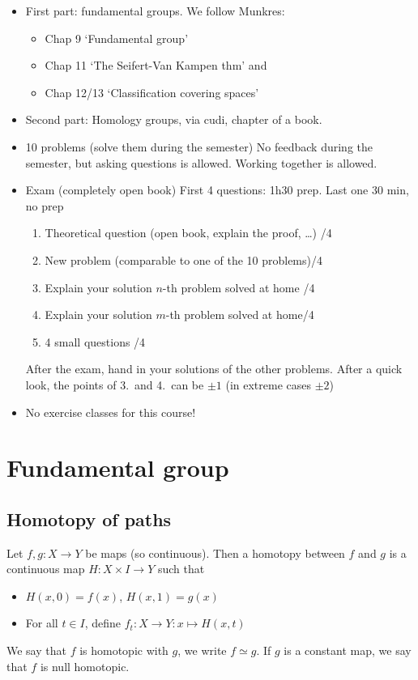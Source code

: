 

\begin{itemize}
    \item First part: fundamental groups. We follow Munkres:
        \begin{itemize}
            \item Chap 9 `Fundamental group'
            \item Chap 11 `The Seifert-Van Kampen thm' and
            \item Chap 12/13 `Classification covering spaces'
        \end{itemize}
    \item Second part: Homology groups, via cudi, chapter of a book.
    \item 10 problems (solve them during the semester) No feedback during the semester, but asking questions is allowed. Working together is allowed.
    \item Exam (completely open book) First 4 questions: 1h30 prep. Last one 30 min, no prep
        \begin{enumerate}
            \item Theoretical question (open book, explain the proof, \ldots) \hfill /4
            \item New problem (comparable to one of the 10 problems)\hfill /4
            \item Explain your solution $n$-th problem solved at home \hfill /4
            \item Explain your solution $m$-th problem solved at home\hfill /4
            \item 4 small questions \hfill /4
        \end{enumerate}
        After the exam, hand in your solutions of the other problems. After a quick look, the points of 3.\ and 4.\ can be $\pm 1$ (in extreme cases $\pm 2$)
    \item No exercise classes for this course!
\end{itemize}

\setcounter{chapter}{-1}
\setcounter{chapter}{8}
\chapter{Fundamental group}

\setcounter{section}{50}
\section{Homotopy of paths}
\begin{definition}[Homotopy]
    Let $f,g:X\to Y$ be maps (so continuous). Then a homotopy between $f$ and $g$ is a continuous map $H: X\times I \to Y$ such that
    \begin{itemize}
        \item $H(x, 0) = f(x)$, $H(x, 1) = g(x)$ 
        \item For all $t \in I$, define $f_t: X \to  Y: x \mapsto  H(x, t)$
    \end{itemize}
    We say that $f$ is homotopic with $g$, we write $f \simeq g$.
    If $g$ is a constant map, we say that $f$ is null homotopic.
\end{definition}


